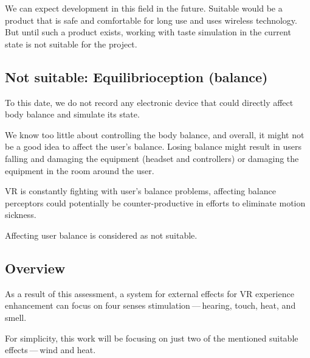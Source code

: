 We can expect development in this field in the future. Suitable would be a product
that is safe and comfortable for long use and uses wireless
technology. But until such a product exists, working with taste simulation
in the current state is not suitable for the project.


\subsection{Not suitable: Equilibrioception (balance)}
To this date, we do not record any electronic device that could
directly affect body balance and simulate its state.

We know too little about controlling the body balance, and overall,
it might not be a good idea to affect the user’s balance. Losing
balance might result in users falling and damaging the equipment (headset and
controllers) or damaging the equipment in the room around the user.

VR is constantly fighting with user’s balance problems,
affecting balance perceptors could potentially be
counter-productive in efforts to eliminate motion sickness.

Affecting user balance is considered as not suitable.

\newpage


\hypertarget{x-overview}{\subsection{Overview}}
As a result of this assessment, a system for external effects for VR experience
enhancement can focus on four senses stimulation — hearing, touch, heat,
and smell.


For simplicity, this work will be focusing on just two of the mentioned suitable
effects — wind and heat.

